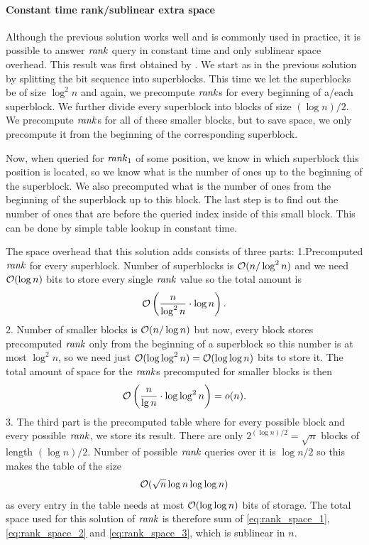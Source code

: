 \paragraph{Constant time rank/sublinear extra space}

Although the previous solution works well and is commonly used in practice, it is possible to
answer $\mathit{rank}$ query in constant time and only sublinear space overhead. This result was first
obtained by \cite{okanohara2007practical}. We start as in the previous solution by splitting
the bit sequence into superblocks. This time we let the superblocks be of size $\log^2 n$
and again, we precompute $\mathit{rank}$s for every beginning of a/each superblock. We further divide every
superblock into blocks of size $(\log n)/2$. We precompute $\mathit{rank}$s for all of these
smaller blocks, but to save space, we only precompute it from the beginning of the corresponding
superblock.

Now, when queried for $\mathit{rank}_1$ of some position, we know in which superblock this
position is located, so we know what is the number of ones up to the beginning of the superblock.
We also precomputed what is the number of ones from the beginning of the superblock up to this
block. The last step is to find out the number of ones that are before the queried index inside of
this small block. This can be done by simple table lookup in constant time.

The space overhead that this solution adds consists of three parts:
1.Precomputed $\mathit{rank}$ for every
superblock. Number of superblocks is $\mathcal{O}(n/\log^2 n)$ and we need $\mathcal{O}(\log n)$ bits to store every
single $\mathit{rank}$ value so the total amount is
\begin{equation}
    \mathcal{O}\left(\frac{n}{\log^2 n}\cdot \log n\right).
    \label{eq:rank_space_1}
\end{equation}
2. Number of smaller blocks is $\mathcal{O}(n/\log n)$ but now, every block stores precomputed $\mathit{rank}$ only from the
beginning of a superblock so this number is at most $\log^2 n$, so we need just $\mathcal{O}(\log\log^2 n)=\mathcal{O}(\log\log n)$
bits to store it. The total amount of space for the $\mathit{rank}$s precomputed for smaller blocks is then
\begin{equation}
    \mathcal{O}\left(\frac{n}{\lg n}\cdot \log\log^2 n\right)=o(n).
    \label{eq:rank_space_2}
\end{equation}
3. The third part is the precomputed table where for every possible block and every
possible $\mathit{rank}$, we store its result. There are only $2^{(\log n)/2} = \sqrt{n}$ blocks of length 
$(\log n)/2$. Number of possible $\mathit{rank}$ queries over it is $\log n/2$ so this makes the table of the size
\begin{equation}
    \mathcal{O}(\sqrt{n}\log n\log\log n)
    \label{eq:rank_space_3}
\end{equation}
as every entry in the table needs at most $\mathcal{O}(\log\log n)$ bits of storage. The total space used for
this solution of $\mathit{rank}$ is therefore sum of \ref{eq:rank_space_1}, \ref{eq:rank_space_2} and
\ref{eq:rank_space_3}, which is sublinear in $n$.

